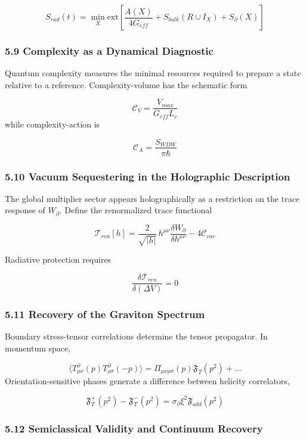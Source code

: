 \documentclass[aps,prd,onecolumn,superscriptaddress,nofootinbib,longbibliography,10pt]{revtex4-2}
\begin{document}
  \[ S_{rad}(t) = \min_X \text{ext}\left[ \frac{A(X)}{4G_{eff}} + S_{bulk}(R \cup I_X) + S_\partial(X) \right] \]

  
\subsubsection*{5.9 Complexity as a Dynamical Diagnostic}

  Quantum complexity measures the minimal resources required to prepare a state relative to a reference. Complexity-volume has the schematic form


  \[ \mathcal{C}_V = \frac{V_{max}}{G_{eff} L_c} \]
  while complexity-action is


  \[ \mathcal{C}_A = \frac{S_{WDW}}{\pi\hbar} \]

  
\subsubsection*{5.10 Vacuum Sequestering in the Holographic Description}

  The global multiplier sector appears holographically as a restriction on the trace response of \(W_\partial\). Define the renormalized trace functional


\[\mathcal{T}_{ren}[h] = \frac{2}{\sqrt{\vert h\vert}}\,h^{\mu\nu}\frac{\delta W_{\partial}}{\delta h^{\mu\nu}} - 4\mathcal{C}_{vac}\]


Radiative protection requires


  \[ \frac{\delta\mathcal{T}_{ren}}{\delta(\Delta V)} = 0 \]

  
\subsubsection*{5.11 Recovery of the Graviton Spectrum}

  Boundary stress-tensor correlations determine the tensor propagator. In momentum space,


  \[ \langle T^\partial_{\mu\nu}(p) T^\partial_{\rho\sigma}(-p) \rangle = \Pi_{\mu\nu\rho\sigma}(p)\mathfrak{F}_T(p^2) + \dots \]
  Orientation-sensitive phases generate a difference between helicity correlators,


  \[ \mathfrak{F}_T^+(p^2) - \mathfrak{F}_T^-(p^2) = \sigma_\partial \xi^2 \mathfrak{F}_{odd}(p^2) \]

  
\subsubsection*{5.12 Semiclassical Validity and Continuum Recovery}
\end{document}
